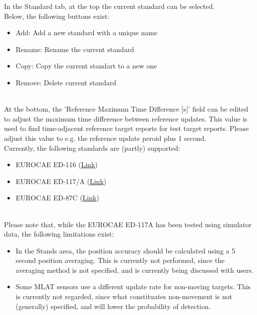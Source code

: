 In the Standard tab, at the top the current standard can be selected. \\

Below, the following buttons exist:
\begin{itemize}  
\item Add: Add a new standard with a unique name
\item Rename: Rename the current standard
\item Copy: Copy the current standart to a new one
\item Remove: Delete current standard
\end{itemize}
\ \\

At the bottom, the 'Reference Maximum Time Difference [s]' field can be edited to adjust the maximum time difference between reference updates. This value is used to find time-adjacent reference target reports for test target reports. Please adjust this value to e.g. the reference update peroid plus 1 second. \\

Currently, the following standards are (partly) supported:
\begin{itemize}  
\item EUROCAE ED-116 (\href{https://eshop.eurocae.net/eurocae-documents-and-reports/ed-116/}{Link})
\item EUROCAE ED-117/A (\href{https://eshop.eurocae.net/eurocae-documents-and-reports/ed-117a/}{Link})
\item EUROCAE ED-87C (\href{https://eshop.eurocae.net/eurocae-documents-and-reports/ed-87c/}{Link})
\end{itemize}
\ \\

Please note that, while the EUROCAE ED-117A has been tested using simulator data, the following limitations exist:
\begin{itemize}  
\item In the Stands area, the position accuracy should be calculated using a 5 second position averaging. This is currently not performed, since the averaging method is not specified, and is currently being discussed with users.
\item Some MLAT sensors use a different update rate for non-moving targets. This is currently not regarded, since what constituates non-movement is not (generally) specified, and will lower the probability of detection. 
\end{itemize}
\ \\

